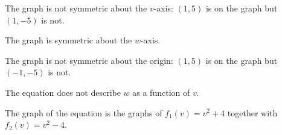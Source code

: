 \documentclass{ximera}
\begin{document}
\begin{multicols}{2}
\begin{enumerate}
\begin{flushleft}
\smallskip

The graph is not symmetric about the $v$-axis:  $(1,5)$ is on the graph but $(1,-5)$ is not. \smallskip

The graph is  symmetric about the $w$-axis. \smallskip

The graph is not symmetric about the origin: $(1,5)$ is on the graph but $(-1, -5)$ is not.  \smallskip

The equation does not describe $w$ as a function of $v$.  \smallskip

The graph of the equation is the graphs of $f_{1}(v) = v^2+4$ together with $f_{2}(v) = v^2-4$.

\end{flushleft}

\setcounter{HW}{\value{enumi}}
\end{enumerate}
\end{multicols}

\newpage
\end{document}
